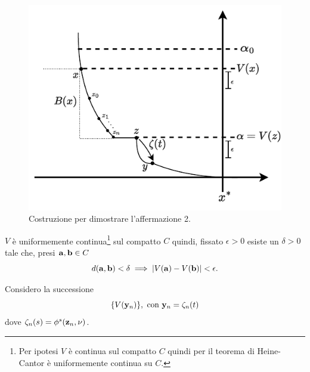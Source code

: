 \begin{steps}
    \hfill
    \begin{minipage}{.8\textwidth}
        \begin{figure}[H]
            \centering
            \includegraphics[width=.7\textwidth]{assets/ljapunov-dim-aff2}
            \caption[Costruzione 2 per teorema di Ljapunov]{Costruzione per dimostrare
            l'affermazione 2.}
            \label{fig:ljapunov-dim-aff2}
        \end{figure}
    \end{minipage}

    $V$ è uniformemente continua\footnote{Per ipotesi
        $V$ è continua sul compatto $C$ quindi per il teorema di Heine-Cantor è
        uniformemente continua su $C$.} sul compatto $C$ quindi, fissato $\epsilon >0$ esiste un $\delta > 0$
    tale che, presi $\mathbf{a}, \mathbf{b} \in C$
    \begin{equation}
        d(\mathbf{a}, \mathbf{b}) < \delta \implies |V(\mathbf{a}) - V(\mathbf{b})| < \epsilon.
        \label{eq:v-uniformemente-continua}
    \end{equation}

    Considero la successione
    \begin{equation*}
        \{V(\mathbf{y}_n)\}, \text{ con } \mathbf{y}_n = \zeta_n(t)
    \end{equation*}
    dove $\zeta_n(s) = \phi^s(\mathbf{z}_n, \nu)$.


\end{steps}
